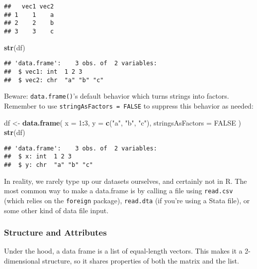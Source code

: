 \documentclass[
]{book}
\newenvironment{Shaded}{\begin{snugshade}}{\end{snugshade}}
\newcommand{\DataTypeTok}[1]{\textcolor[rgb]{0.13,0.29,0.53}{#1}}
\newcommand{\DecValTok}[1]{\textcolor[rgb]{0.00,0.00,0.81}{#1}}
\newcommand{\KeywordTok}[1]{\textcolor[rgb]{0.13,0.29,0.53}{\textbf{#1}}}
\newcommand{\NormalTok}[1]{#1}
\newcommand{\OperatorTok}[1]{\textcolor[rgb]{0.81,0.36,0.00}{\textbf{#1}}}
\newcommand{\OtherTok}[1]{\textcolor[rgb]{0.56,0.35,0.01}{#1}}
\newcommand{\StringTok}[1]{\textcolor[rgb]{0.31,0.60,0.02}{#1}}
\begin{document}
\begin{verbatim}
##   vec1 vec2
## 1    1    a
## 2    2    b
## 3    3    c
\end{verbatim}

\begin{Shaded}
\begin{Highlighting}[]
\KeywordTok{str}\NormalTok{(df)}
\end{Highlighting}
\end{Shaded}

\begin{verbatim}
## 'data.frame':    3 obs. of  2 variables:
##  $ vec1: int  1 2 3
##  $ vec2: chr  "a" "b" "c"
\end{verbatim}

Beware: \texttt{data.frame()}'s default behavior which turns strings into factors. Remember to use \texttt{stringAsFactors\ =\ FALSE} to suppress this behavior as needed:

\begin{Shaded}
\begin{Highlighting}[]
\NormalTok{df \textless{}{-}}\StringTok{ }\KeywordTok{data.frame}\NormalTok{(}
  \DataTypeTok{x =} \DecValTok{1}\OperatorTok{:}\DecValTok{3}\NormalTok{,}
  \DataTypeTok{y =} \KeywordTok{c}\NormalTok{(}\StringTok{"a"}\NormalTok{, }\StringTok{"b"}\NormalTok{, }\StringTok{"c"}\NormalTok{),}
  \DataTypeTok{stringsAsFactors =} \OtherTok{FALSE}
\NormalTok{)}
\KeywordTok{str}\NormalTok{(df)}
\end{Highlighting}
\end{Shaded}

\begin{verbatim}
## 'data.frame':    3 obs. of  2 variables:
##  $ x: int  1 2 3
##  $ y: chr  "a" "b" "c"
\end{verbatim}

In reality, we rarely type up our datasets ourselves, and certainly not in R. The most common way to make a data.frame is by calling a file using \texttt{read.csv} (which relies on the \texttt{foreign} package), \texttt{read.dta} (if you're using a Stata file), or some other kind of data file input.

\hypertarget{structure-and-attributes}{%
\subsubsection{Structure and Attributes}\label{structure-and-attributes}}

Under the hood, a data frame is a list of equal-length vectors. This makes it a 2-dimensional structure, so it shares properties of both the matrix and the list.
\end{document}
